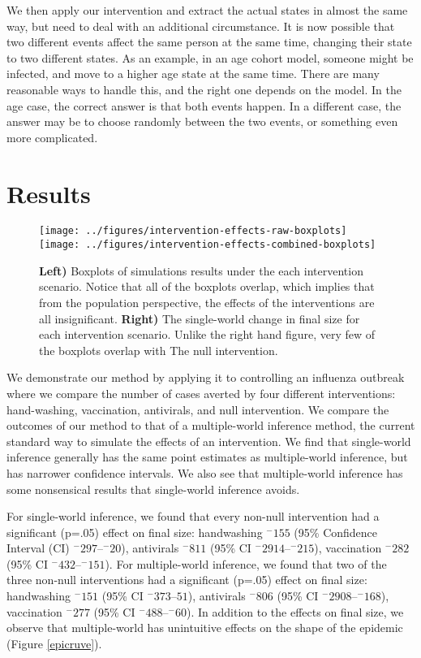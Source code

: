\documentclass[openacc]{rsproca_new}%
\renewcommand{\neg}[1]{^{-}#1}
\begin{document}
We then apply our intervention and extract the actual states in almost the same way, but need to deal with an additional circumstance.
It is now possible that two different events affect the same person at the same time, changing their state to two different states.
As an example, in an age cohort model, someone might be infected, and move to a higher age state at the same time.
There are many reasonable ways to handle this, and the right one depends on the model.
In the age case, the correct answer is that both events happen.
In a different case, the answer may be to choose randomly between the two events, or something even more complicated.

\section{Results}

\begin{figure}\label{fig:epicurve}
\centering
\texttt{[image: ../figures/intervention-effects-raw-boxplots]}
\texttt{[image: ../figures/intervention-effects-combined-boxplots]}
\caption{\textbf{Left)} Boxplots of simulations results under the each intervention scenario.  Notice that all of the boxplots overlap, which implies that from the population perspective, the effects of the interventions are all insignificant.  \textbf{Right)} The single-world change in final size for each intervention scenario.  Unlike the right hand figure, very few of the boxplots overlap with The null intervention.}
\end{figure}

We demonstrate our method by applying it to controlling an influenza outbreak where we compare the number of cases averted by four different interventions: hand-washing, vaccination,  antivirals, and null intervention.
We compare the outcomes of our method to that of a multiple-world inference method, the current standard way to simulate the effects of an intervention.
We find that single-world inference generally has the same point estimates as multiple-world inference, but has narrower confidence intervals.
We also see that multiple-world inference has some nonsensical results that single-world inference avoids.

For single-world inference, we found that every non-null intervention had a significant (p=.05) effect on final size: handwashing $\neg 155$ (95\% Confidence Interval (CI) $\neg 297$--$\neg 20$), antivirals $\neg 811$ (95\% CI $\neg 2914$--$\neg 215$), vaccination $\neg 282$ (95\% CI $\neg 432$--$\neg 151$).
For multiple-world inference, we found that two of the three non-null interventions had a significant (p=.05) effect on final size: handwashing $\neg 151$ (95\% CI $\neg 373$--$51$), antivirals $\neg 806$ (95\% CI $\neg 2908$--$\neg 168$), vaccination $\neg 277$ (95\% CI $\neg 488$--$\neg 60$).
In addition to the effects on final size, we observe that multiple-world has unintuitive effects on the shape of the epidemic (Figure \ref{epicruve}).
\end{document}
